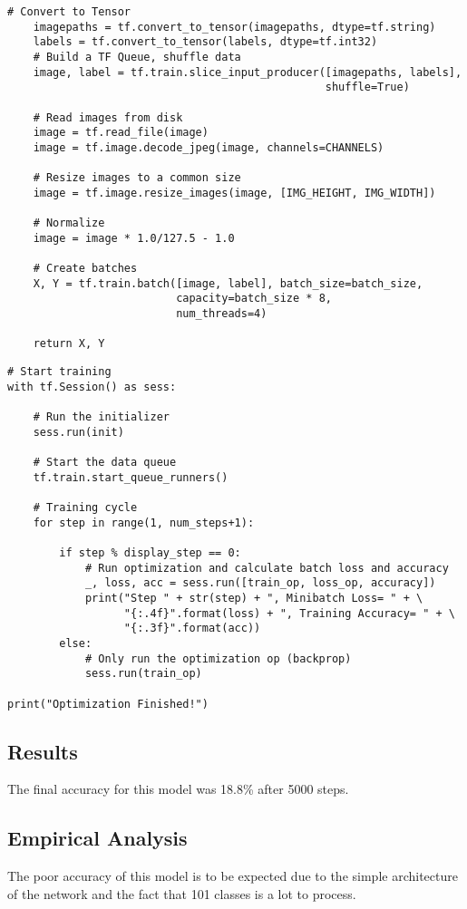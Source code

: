 \begin{lstlisting}
# Convert to Tensor
    imagepaths = tf.convert_to_tensor(imagepaths, dtype=tf.string)
    labels = tf.convert_to_tensor(labels, dtype=tf.int32)
    # Build a TF Queue, shuffle data
    image, label = tf.train.slice_input_producer([imagepaths, labels],
                                                 shuffle=True)

    # Read images from disk
    image = tf.read_file(image)
    image = tf.image.decode_jpeg(image, channels=CHANNELS)

    # Resize images to a common size
    image = tf.image.resize_images(image, [IMG_HEIGHT, IMG_WIDTH])

    # Normalize
    image = image * 1.0/127.5 - 1.0

    # Create batches
    X, Y = tf.train.batch([image, label], batch_size=batch_size,
                          capacity=batch_size * 8,
                          num_threads=4)

    return X, Y

\end{lstlisting}

\begin{lstlisting}
# Start training
with tf.Session() as sess:

    # Run the initializer
    sess.run(init)

    # Start the data queue
    tf.train.start_queue_runners()

    # Training cycle
    for step in range(1, num_steps+1):

        if step % display_step == 0:
            # Run optimization and calculate batch loss and accuracy
            _, loss, acc = sess.run([train_op, loss_op, accuracy])
            print("Step " + str(step) + ", Minibatch Loss= " + \
                  "{:.4f}".format(loss) + ", Training Accuracy= " + \
                  "{:.3f}".format(acc))
        else:
            # Only run the optimization op (backprop)
            sess.run(train_op)

print("Optimization Finished!")
\end{lstlisting}

\subsection*{Results}
The final accuracy for this model was 18.8\% after 5000 steps.

\subsection*{Empirical Analysis}
The poor accuracy of this model is to be expected due to the simple architecture of the network and the fact that 101 classes is a lot to process.